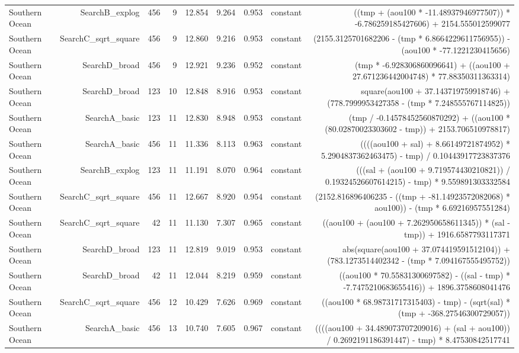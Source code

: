 \begin{table}
{\begin{tabular}{lrrrrrrrr}
Southern Ocean & SearchB\_explog & 456 & 9 & 12.854 & 9.264 & 0.953 & constant & ((tmp + (aou100 * -11.48937946977507)) * -6.786259185427606) + 2154.555012599077 \\
Southern Ocean & SearchC\_sqrt\_square & 456 & 9 & 12.860 & 9.216 & 0.953 & constant & (2155.3125701682206 - (tmp * 6.8664229611756955)) - (aou100 * -77.1221230415656) \\
Southern Ocean & SearchD\_broad & 456 & 9 & 12.921 & 9.236 & 0.952 & constant & (tmp * -6.928306860096641) + ((aou100 + 27.671236442004748) * 77.88350311363314) \\
Southern Ocean & SearchD\_broad & 123 & 10 & 12.848 & 8.916 & 0.953 & constant & square(aou100 + 37.143719759918746) + (778.7999953427358 - (tmp * 7.248555767114825)) \\
Southern Ocean & SearchA\_basic & 123 & 11 & 12.830 & 8.948 & 0.953 & constant & (tmp / -0.14578452560870292) + ((aou100 * (80.02870023303602 - tmp)) + 2153.706510978817) \\
Southern Ocean & SearchA\_basic & 456 & 11 & 11.336 & 8.113 & 0.963 & constant & ((((aou100 + sal) + 8.66149721874952) * 5.2904837362463475) - tmp) / 0.10443917723837376 \\
Southern Ocean & SearchB\_explog & 123 & 11 & 11.191 & 8.070 & 0.964 & constant & (((sal + (aou100 + 9.719574430210821)) / 0.19324526607614215) - tmp) * 9.559891303332584 \\
Southern Ocean & SearchC\_sqrt\_square & 456 & 11 & 12.667 & 8.920 & 0.954 & constant & (2152.816896406235 - ((tmp + -81.14923572082068) * aou100)) - (tmp * 6.69216957551284) \\
Southern Ocean & SearchC\_sqrt\_square & 42 & 11 & 11.130 & 7.307 & 0.965 & constant & ((aou100 + (aou100 + 7.262950658611345)) * (sal - tmp)) + 1916.6587793117371 \\
Southern Ocean & SearchD\_broad & 123 & 11 & 12.819 & 9.019 & 0.953 & constant & abs(square(aou100 + 37.074419591512104)) + (783.1273514402342 - (tmp * 7.094167555495752)) \\
Southern Ocean & SearchD\_broad & 42 & 11 & 12.044 & 8.219 & 0.959 & constant & ((aou100 * 70.55831300697582) - ((sal - tmp) * -7.7475210683655416)) + 1896.3758608041476 \\
Southern Ocean & SearchC\_sqrt\_square & 456 & 12 & 10.429 & 7.626 & 0.969 & constant & ((aou100 * 68.98731717315403) - tmp) - (sqrt(sal) * (tmp + -368.27546300729057)) \\
Southern Ocean & SearchA\_basic & 456 & 13 & 10.740 & 7.605 & 0.967 & constant & ((((aou100 + 34.489073707209016) + (sal + aou100)) / 0.2692191186391447) - tmp) * 8.47530842517741 \\

\end{tabular}}
\end{table}
